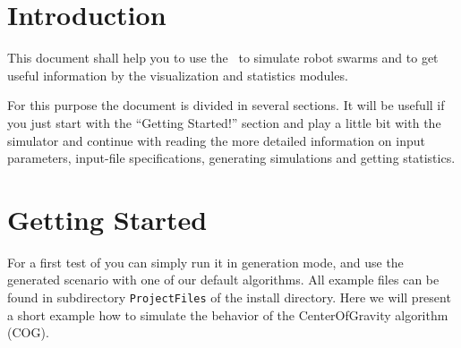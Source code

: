 \documentclass[a4paper,halfparskip,11pt,twoside]{scrartcl}
\begin{document}
\init{}


\section{Introduction}
This document shall help you to use the \RSS\ to simulate robot swarms and to get useful information by the visualization and statistics modules.

For this purpose the document is divided in several sections. It will be usefull if you just start with the ``Getting Started!'' section and play a little bit with the simulator and continue with reading the more detailed information on input parameters, input-file specifications, generating simulations and getting statistics.


\section{Getting Started}
For a first test of \RSS you can simply run it in generation mode, and use the generated scenario with one of our default algorithms. All example files can be found in subdirectory {\tt ProjectFiles} of the install directory. Here we will present a short example how to simulate the behavior of the {\sc CenterOfGravity} algorithm (COG).
\end{document}
